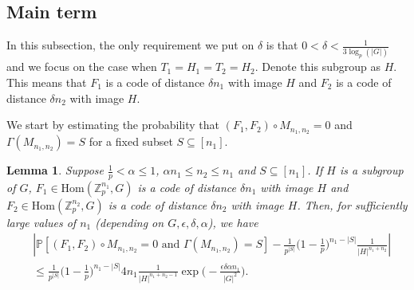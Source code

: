 \documentclass[12pt]{amsart}
\newtheorem{lemma}[theorem]{Lemma}
\theoremstyle{definition}
\newcommand{\PPP}{\mathbb{P}}
\newcommand{\Mnot}{M_{n_1,n_2}}
\newcommand{\abs}[1]{\vert#1\vert}
\newcommand{\Zp}{\Z_p}
\newcommand{\Z}{\mathbb{Z}}
\newcommand{\Hom}{\text{Hom}}
\begin{document}
\subsection{Main term}

In this subsection, the only requirement we put on $\delta$ is that $0<\delta<\frac{1}{3\log_p(\abs{G})}$ and we focus on the case when $T_1=H_1=T_2=H_2$. Denote this subgroup as $H$.
This means that $F_1$ is a code of distance $\delta n_1$ with image $H$ and $F_2$ is a code of distance $\delta n_2$ with image $H$.


We start by estimating the probability that $(F_1,F_2)\circ \Mnot=0$ and $\Gamma(\Mnot)=S$ for a fixed subset $S\subseteq [n_1]$.

\begin{lemma}\label{Lem: both codes, fixed S}
Suppose $\frac{1}{p}<\alpha\leq 1$,
$\alpha n_1\leq n_2\leq n_1$ and $S\subseteq[n_1]$.
If $H$ is a subgroup of $G$, $F_1\in\Hom(\Zp^{n_1},G)$ is a code of distance $\delta n_1$ with image $H$ and $F_2\in\Hom(\Zp^{n_2},G)$ is a code of distance $\delta n_2$ with image $H$. Then, for sufficiently large values of $n_1$ (depending on $G,\epsilon,\delta,\alpha$), we have
\begin{align*}
&\left|
\PPP[(F_1,F_2)\circ \Mnot=0 \text{ and }\Gamma(\Mnot)=S] 
- \frac{1}{p^{|S|}} \Big(1-\frac{1}{p}\Big)^{n_1-|S|} \frac{1}{|H|^{n_1+n_2}}
\right|\\
&\leq \frac{1}{p^{|S|}} \Big(1-\frac{1}{p}\Big)^{n_1-|S|} 4n_1\frac{1}{\abs{H}^{n_1+n_2-1}} \exp\Big(-\frac{\epsilon\delta \alpha n_1}{|G|^2}\Big).
\end{align*}
\end{lemma}
\end{document}
